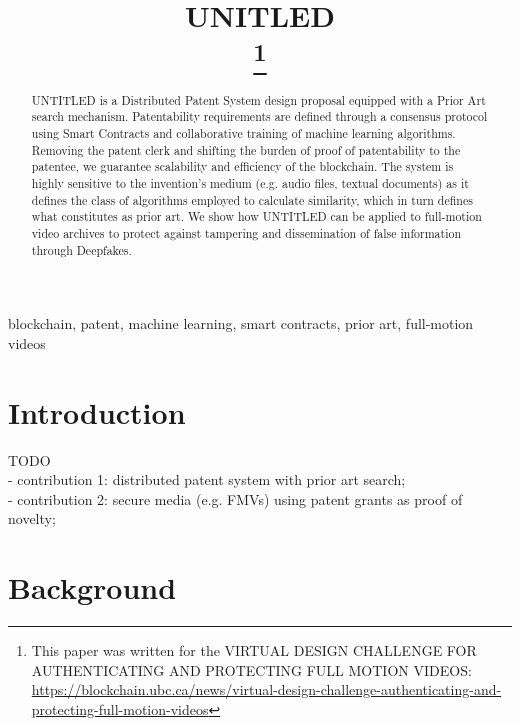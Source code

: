 \documentclass[conference]{IEEEtran}
\begin{document}
\title{UNITLED\\
\thanks{This paper was written for the VIRTUAL DESIGN CHALLENGE FOR AUTHENTICATING AND PROTECTING FULL MOTION VIDEOS: \url{https://blockchain.ubc.ca/news/virtual-design-challenge-authenticating-and-protecting-full-motion-videos}}
}

\author{
}

\maketitle

\begin{abstract}
UNTITLED is a Distributed Patent System design proposal equipped with a Prior Art search mechanism. Patentability requirements are defined through a consensus protocol using Smart Contracts and collaborative training of machine learning algorithms. Removing the patent clerk and shifting the burden of proof of patentability to the patentee, we guarantee scalability and efficiency of the blockchain. The system is highly sensitive to the invention’s medium (e.g. audio files, textual documents) as it defines the class of algorithms employed to calculate similarity, which in turn defines what constitutes as prior art. We show how UNTITLED can be applied to full-motion video archives to protect against tampering and dissemination of false information through Deepfakes.\end{abstract}

\begin{IEEEkeywords}
blockchain, patent, machine learning, smart contracts, prior art, full-motion videos
\end{IEEEkeywords}

\section{Introduction}
TODO\\
- contribution 1: distributed patent system with prior art search;\\
- contribution 2: secure media (e.g. FMVs) using patent grants as proof of novelty;

\section{Background}
\end{document}
